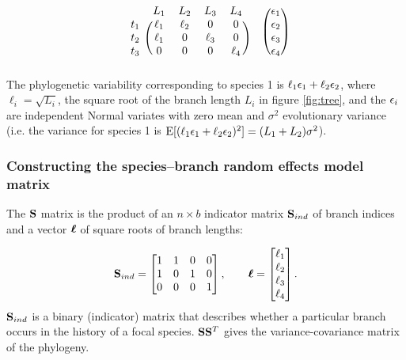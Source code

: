 \documentclass[12pt]{article}
\begin{document}
\[
  \begin{blockarray}{ccccc}
  & L_1 & L_2 & L_3 & L_4  \\
  \begin{block}{c(cccc)}
  t_1 & \ell_1 & \ell_2 & 0           & 0 \\
  t_2 & \ell_1 &  0          & \ell_3 & 0 \\
  t_3 & 0           &  0          & 0           & \ell_4 \\
  \end{block}
  \end{blockarray}
  \hspace{0.5cm}
  \begin{blockarray}{(c)}
  \e_1 \\
  \e_2 \\
  \e_3 \\
  \e_4 \\
  \end{blockarray}
  \]
The phylogenetic variability corresponding to species 1 is $\ell_1 { \epsilon}_1 + \ell_2 { \epsilon}_2$, where $\ell_i = \sqrt{L_i}$, the square root of the branch length $L_i$ in figure \ref{fig:tree}, and the ${ \epsilon}_i$ are independent Normal variates with zero mean and $\sigma^2$ evolutionary variance (i.e. the variance for species 1 is $\textrm{E}[(\ell_1 { \epsilon}_1 + \ell_2 { \epsilon}_2)^2] = (L_1 + L_2)\sigma^2$).

\subsubsection*{Constructing the species--branch random effects model matrix}

The ${\mathbf S}$ matrix is the product of an $n \times b$ indicator matrix ${\mathbf S}_{ind}$ of branch indices and a vector ${\boldsymbol \ell}$ of square roots of branch lengths:

\[
{\mathbf S}_{ind} = \begin{bmatrix}
1 & 1 & 0 & 0 \\ 
1 & 0 & 1 & 0 \\ 
0 & 0 & 0 & 1
\end{bmatrix} , 
\qquad
{\boldsymbol \ell} = \begin{bmatrix}
\ell_1 \\
\ell_2 \\
\ell_3 \\
\ell_4 
\end{bmatrix} .
\]
${\mathbf S}_{ind}$ is a binary (indicator) matrix that describes whether a particular branch occurs in the history of a focal species. 
${\mathbf S} {\mathbf S}^T$ gives the variance-covariance matrix of the phylogeny. 
\end{document}
